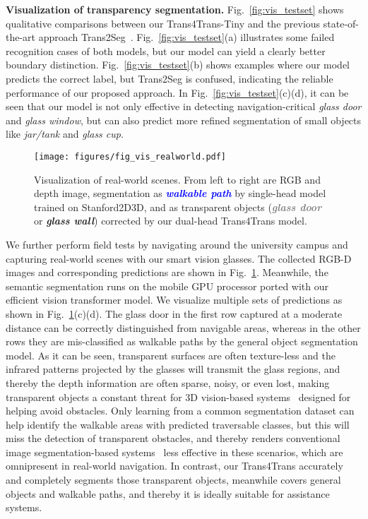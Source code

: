 \documentclass[journal]{IEEEtran}
\begin{document}
\noindent\textbf{Visualization of transparency segmentation.}
Fig.~\ref{fig:vis_testset} shows qualitative comparisons between our Trans4Trans-Tiny and the previous state-of-the-art approach Trans2Seg~\cite{xie2021segmenting}. Fig.~\ref{fig:vis_testset}(a) illustrates some failed recognition cases of both models, but our model can yield a clearly better boundary distinction. Fig.~\ref{fig:vis_testset}(b) shows examples where our model predicts the correct label, but Trans2Seg is confused, indicating the reliable performance of our proposed approach. In Fig.~\ref{fig:vis_testset}(c)(d), it can be seen that our model is not only effective in detecting navigation-critical \emph{glass door} and \emph{glass window}, but can also predict more refined segmentation of small objects like \emph{jar/tank} and \emph{glass cup}.

\begin{figure}[!t]
    \centering
    \texttt{[image: figures/fig\_vis\_realworld.pdf]}
\caption{\small Visualization of real-world scenes. From left to right are RGB and depth image, segmentation as \textcolor{blue}{\emph{\textbf{walkable path}}} by single-head model trained on Stanford2D3D, and as transparent objects (\textcolor{gray}{\emph{\textbf{glass door}}} or \textcolor{mask_red}{\emph{\textbf{glass wall}}}) corrected by our dual-head Trans4Trans model.}
    \label{fig:vis_realworld}
\end{figure}

We further perform field tests by navigating around the university campus and capturing real-world scenes with our smart vision glasses. The collected RGB-D images and corresponding predictions are shown in Fig.~\ref{fig:vis_realworld}. Meanwhile, the semantic segmentation runs on the mobile GPU processor ported with our efficient vision transformer model. We visualize multiple sets of predictions as shown in Fig.~\ref{fig:vis_realworld}(c)(d). The glass door in the first row captured at a moderate distance can be correctly distinguished from navigable areas, whereas in the other rows they are mis-classified as walkable paths by the general object segmentation model. As it can be seen, transparent surfaces are often texture-less and the infrared patterns projected by the glasses will transmit the glass regions, and thereby the depth information are often sparse, noisy, or even lost, making transparent objects a constant threat for 3D vision-based systems~\cite{aladren2014navigation,wang2017enabling} designed for helping avoid obstacles. Only learning from a common segmentation dataset can help identify the walkable areas with predicted traversable classes, but this will miss the detection of transparent obstacles, and thereby renders conventional image segmentation-based systems~\cite{yang2018unifying,lin2019deep} less effective in these scenarios, which are omnipresent in real-world navigation. In contrast, our Trans4Trans accurately and completely segments those transparent objects, meanwhile covers general objects and walkable paths, and thereby it is ideally suitable for assistance systems.
\end{document}
